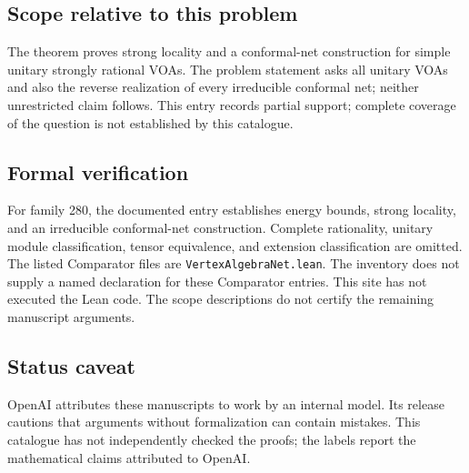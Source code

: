 \documentclass[11pt]{article}
\begin{document}
\subsection{Scope relative to this problem}
The theorem proves strong locality and a conformal-net construction for simple unitary strongly rational VOAs. The problem statement asks all unitary VOAs and also the reverse realization of every irreducible conformal net; neither unrestricted claim follows. This entry records partial support; complete coverage of the question is not established by this catalogue.

\subsection{Formal verification}
For family 280, the documented entry establishes energy bounds, strong locality, and an irreducible conformal-net construction. Complete rationality, unitary module classification, tensor equivalence, and extension classification are omitted. The listed Comparator files are \texttt{VertexAlgebraNet.lean}. The inventory does not supply a named declaration for these Comparator entries. This site has not executed the Lean code. The scope descriptions do not certify the remaining manuscript arguments.

\subsection{Status caveat}
OpenAI attributes these manuscripts to work by an internal model. Its release cautions that arguments without formalization can contain mistakes. This catalogue has not independently checked the proofs; the labels report the mathematical claims attributed to OpenAI.
\end{document}
